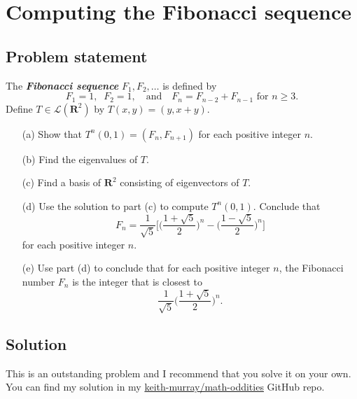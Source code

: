 \documentclass{article}
\begin{document}
\clearpage

\renewcommand{\thesection}{16}
\section{Computing the Fibonacci sequence}
\subsection*{Problem statement}
The \textbf{\textit{Fibonacci sequence}} $F_1,F_2,\ldots$ is defined by
\[F_1=1,\;\;F_2=1,\quad\text{and}\quad F_n=F_{n-2}+F_{n-1}\text{ for }n\geq3.\]
Define $T\in\mathcal{L}(\mathbf{R}^2)$ by $T(x,y)=(y,x+y)$.

\begin{itemize}
    \item[(a)] Show that $T^n(0,1)=(F_n,F_{n+1})$ for each positive integer $n$.
    \item[(b)] Find the eigenvalues of $T$.
    \item[(c)] Find a basis of $\mathbf{R}^2$ consisting of eigenvectors of $T$.
    \item[(d)] Use the solution to part (c) to compute $T^n(0,1)$. Conclude that \[F_n=\frac{1}{\sqrt{5}}\Big[\Big(\frac{1+\sqrt{5}}{2}\Big)^n-\Big(\frac{1-\sqrt{5}}{2}\Big)^n\Big]\] for each positive integer $n$.
    \item[(e)] Use part (d) to conclude that for each positive integer $n$, the Fibonacci number $F_n$ is the integer that is closest to \[\frac{1}{\sqrt{5}}\Big(\frac{1+\sqrt{5}}{2}\Big)^n.\]
\end{itemize}

\subsection*{Solution}
This is an outstanding problem and I recommend that you solve it on your own. 
You can find my solution in my \href{https://github.com/keith-murray/math-oddities}{keith-murray/math-oddities} GitHub repo.
\end{document}
